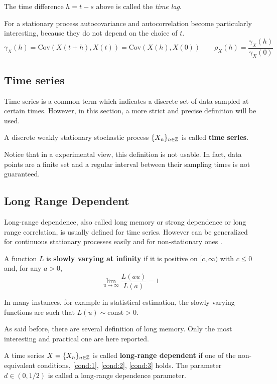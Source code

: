 The time difference $h = t - s$ above is called the \emph{time lag}.

For a stationary process autocovariance and autocorrelation become particularly interesting, because they do not depend on the choice of $t$.
\begin{equation}
	\gamma_X(h) = \text{Cov}(X(t+h), X(t)) = \text{Cov}(X(h), X(0)) \qquad \rho_X(h) = \frac{\gamma_X(h)}{\gamma_X(0)}
\end{equation}
\subsection{Time series}
Time series is a common term which indicates a discrete set of data sampled at certain times. However, in this section, a more strict and precise definition will be used.
\begin{definition}
	A discrete weakly stationary stochastic process $\{X_n\}_{n \in \mathbb{Z}}$ is called \textbf{time series}.
\end{definition}

Notice that in a experimental view, this definition is not usable. In fact, data points are a finite set and a regular interval between their sampling times is not guaranteed.

\subsection{Long Range Dependent}
Long-range dependence, also called long memory or strong dependence or long range correlation, is usually defined for time series. However can be generalized for continuous stationary processes easily \cite{pipiras_taqqu_2017} and for non-stationary ones \cite{Movahed_2006}.

\begin{definition}
	A function $L$ is \textbf{slowly varying at infinity} if it is positive on $[c, \infty)$ with $c \le 0$ and, for any $a > 0$,
	\begin{equation}
		\lim_{u \to \infty} \frac{L(au)}{L(a)} = 1
	\end{equation}
\end{definition}

In many instances, for example in statistical estimation, the slowly varying
functions are such that $L(u) \sim \text{const} > 0$. 

As said before, there are several definition of long memory. Only the most interesting and practical one are here reported.
\begin{definition}
	A time series $X = \{ X_n \}_{n \in \mathbb{Z}}$ is called \textbf{long-range dependent} if one of the non-equivalent conditions, \autoref{cond:1}, \autoref{cond:2}, \autoref{cond:3} holds. The parameter $d \in (0, 1/2)$ is called a \textnormal{long-range dependence parameter}.
\end{definition}

